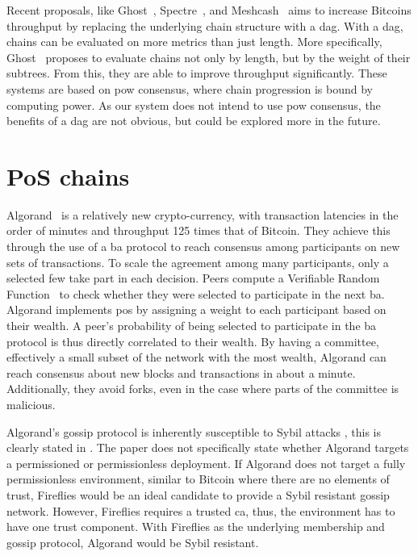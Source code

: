 \documentclass[USenglish]{uit-thesis}
\begin{document}
Recent proposals, like Ghost~\cite{ghost, ghost2}, Spectre~\cite{spec}, and Meshcash~\cite{tort} aims to increase Bitcoins throughput by replacing the underlying chain structure with a \gls{dag}.
With a \gls{dag}, chains can be evaluated on more metrics than just length.
More specifically, Ghost~\cite{ghost} proposes to evaluate chains not only by length, but by the weight of their subtrees.
From this, they are able to improve throughput significantly.
These systems are based on \gls{pow} consensus, where chain progression is bound by computing power.
As our system does not intend to use \gls{pow} consensus, the benefits of a \gls{dag} are not obvious, but could be explored more in the future.


\section{PoS chains}
Algorand~\cite{algorand, algorand2} is a relatively new crypto-currency, with transaction latencies in the order of minutes and throughput 125 times that of Bitcoin.
They achieve this through the use of a \gls{ba} protocol to reach consensus among participants on new sets of transactions.
To scale the agreement among many participants, only a selected few take part in each decision.
Peers compute a Verifiable Random Function~\cite{verirandom} to check whether they were selected to participate in the next \gls{ba}.
Algorand implements \gls{pos} by assigning a weight to each participant based on their wealth.
A peer's probability of being selected to participate in the \gls{ba} protocol is thus directly correlated to their wealth.  
By having a committee, effectively a small subset of the network with the most wealth, Algorand can reach consensus about new blocks and transactions in about a minute. 
Additionally, they avoid forks, even in the case where parts of the committee is malicious.

Algorand's gossip protocol is inherently susceptible to Sybil attacks \cite{sybil}, this is clearly stated in \cite{algorand}.
The paper does not specifically state whether Algorand targets a permissioned or permissionless deployment.
If Algorand does not target a fully permissionless environment, similar to Bitcoin \cite{bitcoin} where there are no elements of trust, Fireflies \cite{flies} would be an ideal candidate to provide a Sybil resistant gossip network.
However, Fireflies requires a trusted \gls{ca}, thus, the environment has to have one trust component.
With Fireflies as the underlying membership and gossip protocol, Algorand would be Sybil resistant.
\end{document}
